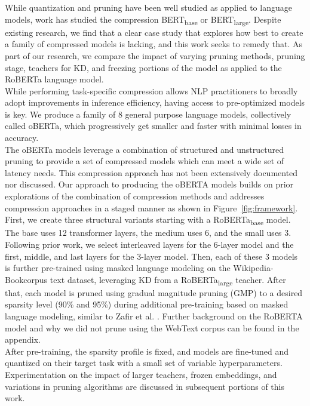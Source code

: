 While quantization and pruning have been well studied as applied to language models, work has studied the compression BERT\textsubscript{base} or BERT\textsubscript{large}. Despite existing research, we find that a clear case study that explores how best to create a family of compressed models is lacking, and this work seeks to remedy that. As part of our research, we compare the impact of varying pruning methods, pruning stage, teachers for KD, and freezing portions of the model as applied to the RoBERTa language model.\\
While performing task-specific compression allows NLP practitioners to broadly adopt improvements in inference efficiency, having access to pre-optimized models is key. We produce a family of 8 general purpose language models, collectively called oBERTa, which progressively get smaller and faster with minimal losses in accuracy. \\
The oBERTa models leverage a combination of structured and unstructured pruning to provide a set of compressed models which can meet a wide set of latency needs. This compression approach has not been extensively documented nor discussed. Our approach to producing the oBERTA models builds on prior explorations of the combination of compression methods \cite{Kurti2022TheOB} and addresses compression approaches in a staged manner as shown in Figure~\ref{fig:framework}.\\
First, we create three structural variants starting with a RoBERTa\textsubscript{base} model. The base uses 12 transformer layers, the medium uses 6, and the small uses 3. Following prior work, we select interleaved layers for the 6-layer model and the first, middle, and last layers for the 3-layer model. Then, each of these 3 models is further pre-trained using masked language modeling on the Wikipedia-Bookcorpus text dataset, leveraging KD from a  RoBERTa\textsubscript{large} teacher. After that, each model is pruned using gradual magnitude pruning (GMP) to a desired sparsity level (90\% and 95\%) during additional pre-training based on masked language modeling, similar to Zafir et al. \cite{Zafrir2021PruneOF}. Further background on the RoBERTA model and why we did not prune using the WebText corpus can be found in the appendix. \\
After pre-training, the sparsity profile is fixed, and models are fine-tuned and quantized on their target task with a small set of variable hyperparameters. Experimentation on the impact of larger teachers, frozen embeddings, and variations in pruning algorithms are discussed in subsequent portions of this work. 
